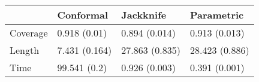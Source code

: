 \begin{tabular}{|l|l|l|l|}
\hline
& Conformal & Jackknife & Parametric \\
\hline
Coverage & 0.918 (0.01) & 0.894 (0.014) & 0.913 (0.013) \\
\hline
Length & 7.431 (0.164) & 27.863 (0.835) & 28.423 (0.886) \\
\hline
Time & 99.541 (0.2) & 0.926 (0.003) & 0.391 (0.001) \\
\hline
\end{tabular}
